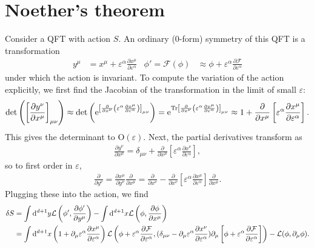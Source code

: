 \documentclass[11pt]{article}
\newcommand{\e}{\mathrm{e}}
\renewcommand{\epsilon}{\varepsilon}
\begin{document}
\section{Noether's theorem}
Consider a QFT with action $S$. An ordinary (0-form) symmetry of this QFT is a
transformation
\begin{align}
y^\mu &= x^{\mu} + \epsilon^\alpha \frac{\partial x^\mu}{\partial \epsilon^\alpha} &  \phi'  = \mathcal F(\phi) &\approx \phi + \epsilon^\alpha\frac{\partial \mathcal F}{\partial \epsilon^\alpha}
\end{align}
under which the action is invariant. To compute the variation of the action
explicitly, we first find the Jacobian of the transformation in the limit of
small $\epsilon$:
\begin{align}
\det\left(\left[\frac{\partial y^\nu}{\partial x^\mu}\right]_{\mu \nu}\right) \approx \det\left(\e^{\left[\frac{\partial}{\partial x^\nu}\left(\epsilon^\alpha\frac{\partial x^\mu}{\partial \epsilon^\alpha}\right)\right]_{\mu \nu}}\right) = \e^{\Tr\left[\frac{\partial}{\partial x^\nu}\left(\epsilon^\alpha\frac{\partial x^\mu}{\partial \epsilon^\alpha}\right)\right]_{\mu \nu}} \approx 1+\frac{\partial}{\partial x^\mu}\left[\epsilon^\alpha\frac{\partial x^\mu}{\partial \epsilon^\alpha}\right] .
\end{align}
This gives the determinant to $\mathrm O(\epsilon)$. Next, the partial
derivatives transform as
\begin{align}
  \frac{\partial y^\nu}{\partial x^\mu} = \delta_{\mu\nu} + \frac{\partial}{\partial x^\mu}\left[\epsilon^\alpha \frac{\partial x^\nu}{\partial \epsilon^\alpha}\right] ,
\end{align}
so to first order in $\epsilon$,
\begin{align}
  \frac{\partial}{\partial y^\nu} = \frac{\partial x^\mu}{\partial y^\nu}\frac{\partial}{\partial x^\mu} =  \frac{\partial}{\partial x^\nu} - \frac{\partial}{\partial x^\nu}\left[\epsilon^\alpha \frac{\partial x^\mu}{\partial \epsilon^\alpha}\right]\frac{\partial}{\partial x^\mu} .
\end{align}
Plugging these into the action, we find
\begin{align}
  \delta S & = \int \dd^{d+1} y \mathcal L\left(\phi', \frac{\partial \phi'}{\partial y^\mu}\right) - \int \dd^{d+1} x \mathcal L\left(\phi, \frac{\partial \phi}{\partial x^\mu}\right) \notag\\
  &= \int \dd^{d+1}x \left(1 + \partial_\mu \epsilon^\alpha \frac{\partial x^\mu}{\partial \epsilon^\alpha}\right)\mathcal L\left(\phi + \epsilon^\alpha\frac{\partial \mathcal F}{\partial \epsilon^\alpha}, (\delta_{\mu \nu} - \partial_\mu \epsilon^\alpha\frac{\partial x^\nu}{\partial \epsilon^\alpha})\partial_\mu \left[\phi + \epsilon^\alpha\frac{\partial \mathcal F}{\partial \epsilon^\alpha}\right]\right) - \mathcal L(\phi,\partial_\mu \phi) .
\end{align}
\end{document}
